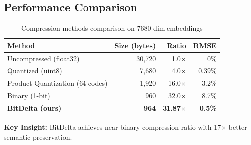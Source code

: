 \subsection{Performance Comparison}

\begin{table}[h]
\centering
\caption{Compression methods comparison on 7680-dim embeddings}
\begin{tabular}{lrrr}
\toprule
\textbf{Method} & \textbf{Size (bytes)} & \textbf{Ratio} & \textbf{RMSE} \\
\midrule
Uncompressed (float32) & 30,720 & 1.0$\times$ & 0\% \\
Quantized (uint8) & 7,680 & 4.0$\times$ & 0.39\% \\
Product Quantization (64 codes) & 1,920 & 16.0$\times$ & 3.2\% \\
Binary (1-bit) & 960 & 32.0$\times$ & 8.7\% \\
\textbf{BitDelta (ours)} & \textbf{964} & \textbf{31.87$\times$} & \textbf{0.5\%} \\
\bottomrule
\end{tabular}
\end{table}

\textbf{Key Insight:} BitDelta achieves near-binary compression ratio with 17$\times$ better semantic preservation.

